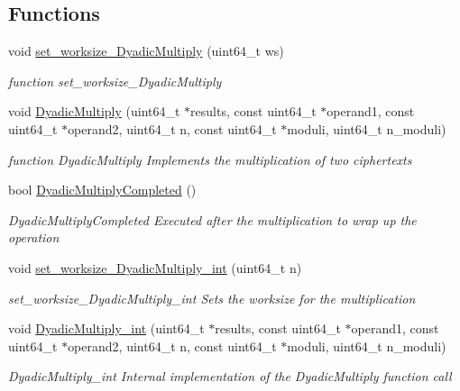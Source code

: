 \subsection*{Functions}
\begin{DoxyCompactItemize}
\item 
void \hyperlink{namespaceintel_1_1hexl_1_1fpga_ac793304e5a77cc4fb89d4d5c1c734e3d}{set\-\_\-worksize\-\_\-\-Dyadic\-Multiply} (uint64\-\_\-t ws)
\begin{DoxyCompactList}\small\item\em function set\-\_\-worksize\-\_\-\-Dyadic\-Multiply \end{DoxyCompactList}\item 
void \hyperlink{namespaceintel_1_1hexl_1_1fpga_a5f78490650fba97fc6837d2fee8554d8}{Dyadic\-Multiply} (uint64\-\_\-t $\ast$results, const uint64\-\_\-t $\ast$operand1, const uint64\-\_\-t $\ast$operand2, uint64\-\_\-t n, const uint64\-\_\-t $\ast$moduli, uint64\-\_\-t n\-\_\-moduli)
\begin{DoxyCompactList}\small\item\em function Dyadic\-Multiply Implements the multiplication of two ciphertexts \end{DoxyCompactList}\item 
bool \hyperlink{namespaceintel_1_1hexl_1_1fpga_a69e806b0006ab56a1c24a47ee0585952}{Dyadic\-Multiply\-Completed} ()
\begin{DoxyCompactList}\small\item\em Dyadic\-Multiply\-Completed Executed after the multiplication to wrap up the operation \end{DoxyCompactList}\item 
void \hyperlink{namespaceintel_1_1hexl_1_1fpga_af34f7448c403a2654c71fae865199579}{set\-\_\-worksize\-\_\-\-Dyadic\-Multiply\-\_\-int} (uint64\-\_\-t n)
\begin{DoxyCompactList}\small\item\em set\-\_\-worksize\-\_\-\-Dyadic\-Multiply\-\_\-int Sets the worksize for the multiplication \end{DoxyCompactList}\item 
void \hyperlink{namespaceintel_1_1hexl_1_1fpga_aa15dd341954b9ce8c0915fbb3a8df602}{Dyadic\-Multiply\-\_\-int} (uint64\-\_\-t $\ast$results, const uint64\-\_\-t $\ast$operand1, const uint64\-\_\-t $\ast$operand2, uint64\-\_\-t n, const uint64\-\_\-t $\ast$moduli, uint64\-\_\-t n\-\_\-moduli)
\begin{DoxyCompactList}\small\item\em Dyadic\-Multiply\-\_\-int Internal implementation of the Dyadic\-Multiply function call \end{DoxyCompactList}\item 

\end{DoxyCompactItemize}

